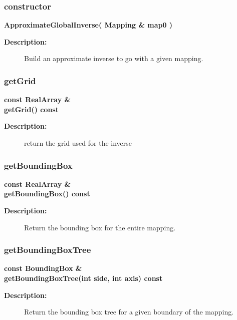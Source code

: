 \subsubsection{constructor}
 
\newlength{\ApproximateGlobalInverseIncludeArgIndent}
\begin{flushleft} \textbf{%
\settowidth{\ApproximateGlobalInverseIncludeArgIndent}{ApproximateGlobalInverse(}%
ApproximateGlobalInverse( Mapping \& map0 )
}\end{flushleft}
\begin{description}
\item[{\bf Description:}] 
   Build an approximate inverse to go with a given mapping.
\end{description}
\subsubsection{getGrid}
 
\begin{flushleft} \textbf{%
const RealArray \&  \\ 
\settowidth{\ApproximateGlobalInverseIncludeArgIndent}{getGrid(}%
getGrid() const
}\end{flushleft}
\begin{description}
\item[{\bf Description:}] 
 return the grid used for the inverse
\end{description}
\subsubsection{getBoundingBox}
 
\begin{flushleft} \textbf{%
const RealArray \&  \\ 
\settowidth{\ApproximateGlobalInverseIncludeArgIndent}{getBoundingBox(}%
getBoundingBox() const
}\end{flushleft}
\begin{description}
\item[{\bf Description:}] 
   Return the bounding box for the entire mapping.
\end{description}
\subsubsection{getBoundingBoxTree}
 
\begin{flushleft} \textbf{%
const BoundingBox \&  \\ 
\settowidth{\ApproximateGlobalInverseIncludeArgIndent}{getBoundingBoxTree(}%
getBoundingBoxTree(int side, int axis) const
}\end{flushleft}
\begin{description}
\item[{\bf Description:}] 
   Return the bounding box tree for a given boundary of the mapping.
\end{description}

